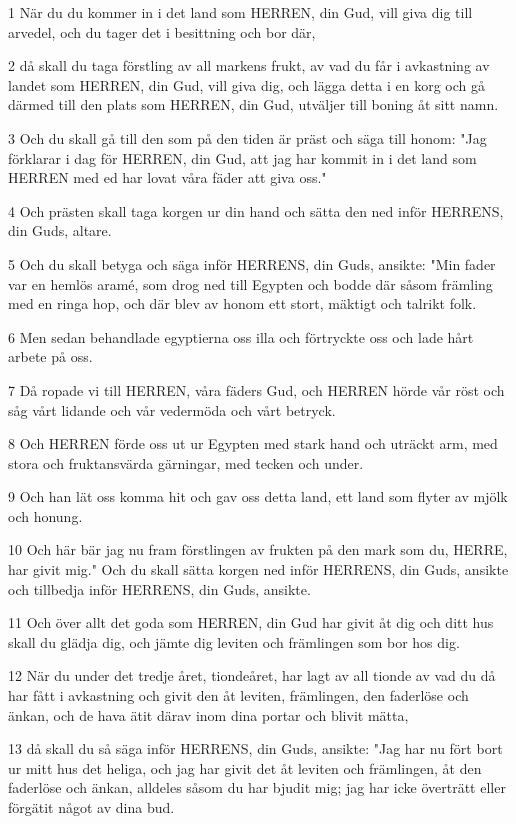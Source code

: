 \par 1 När du du kommer in i det land som HERREN, din Gud, vill giva dig till arvedel, och du tager det i besittning och bor där,
\par 2 då skall du taga förstling av all markens frukt, av vad du får i avkastning av landet som HERREN, din Gud, vill giva dig, och lägga detta i en korg och gå därmed till den plats som HERREN, din Gud, utväljer till boning åt sitt namn.
\par 3 Och du skall gå till den som på den tiden är präst och säga till honom: "Jag förklarar i dag för HERREN, din Gud, att jag har kommit in i det land som HERREN med ed har lovat våra fäder att giva oss."
\par 4 Och prästen skall taga korgen ur din hand och sätta den ned inför HERRENS, din Guds, altare.
\par 5 Och du skall betyga och säga inför HERRENS, din Guds, ansikte: "Min fader var en hemlös aramé, som drog ned till Egypten och bodde där såsom främling med en ringa hop, och där blev av honom ett stort, mäktigt och talrikt folk.
\par 6 Men sedan behandlade egyptierna oss illa och förtryckte oss och lade hårt arbete på oss.
\par 7 Då ropade vi till HERREN, våra fäders Gud, och HERREN hörde vår röst och såg vårt lidande och vår vedermöda och vårt betryck.
\par 8 Och HERREN förde oss ut ur Egypten med stark hand och uträckt arm, med stora och fruktansvärda gärningar, med tecken och under.
\par 9 Och han lät oss komma hit och gav oss detta land, ett land som flyter av mjölk och honung.
\par 10 Och här bär jag nu fram förstlingen av frukten på den mark som du, HERRE, har givit mig." Och du skall sätta korgen ned inför HERRENS, din Guds, ansikte och tillbedja inför HERRENS, din Guds, ansikte.
\par 11 Och över allt det goda som HERREN, din Gud har givit åt dig och ditt hus skall du glädja dig, och jämte dig leviten och främlingen som bor hos dig.
\par 12 När du under det tredje året, tiondeåret, har lagt av all tionde av vad du då har fått i avkastning och givit den åt leviten, främlingen, den faderlöse och änkan, och de hava ätit därav inom dina portar och blivit mätta,
\par 13 då skall du så säga inför HERRENS, din Guds, ansikte: "Jag har nu fört bort ur mitt hus det heliga, och jag har givit det åt leviten och främlingen, åt den faderlöse och änkan, alldeles såsom du har bjudit mig; jag har icke överträtt eller förgätit något av dina bud.
